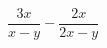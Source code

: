 \begin{ex}[type=expressions]
	\begin{condition}
		\( \dfrac{3x}{x-y}-\dfrac{2x}{2x-y} \)
	\end{condition}
\end{ex}
